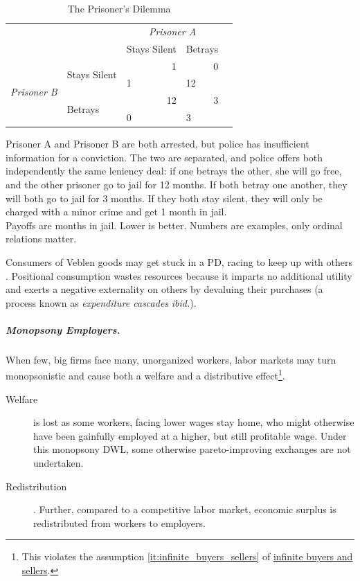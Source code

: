 \begin{table}
			\caption{The Prisoner's Dilemma}
			\label{tab:PD}
			\begin{center}
			\begin{tabular}{m{1cm}m{2,3cm}m{}m{}m{}}
				& & \multicolumn{2}{c}{\emph{Prisoner A}} \\
				& &Stays Silent & Betrays\\ 
				\cline{3-4}
				\multicolumn{1}{c}{\multirow{4}{*}{\emph{Prisoner B}}} & \multirow{2}{}{Stays Silent} & 		\multicolumn{1}{|r|}{1} & \multicolumn{1}{r|}{0}\\ 
				\multicolumn{1}{c}{} & \multicolumn{1}{c}{}& \multicolumn{1}{|l|}{1} & \multicolumn{1}{l|}{12}\\ 
				\cline{3-4}
				\multicolumn{1}{c}{} & \multirow{2}{2,3cm}{Betrays} & \multicolumn{1}{|r|}{12} & \multicolumn{1}{r|}{3}\\ 
				\multicolumn{1}{c}{} & \multicolumn{1}{c}{}& \multicolumn{1}{|l|}{0} & \multicolumn{1}{l|}{3}\\ 
				\cline{3-4}
			\end{tabular}
			\end{center}
			\scriptsize{Prisoner A and Prisoner B are both arrested, but police has insufficient information for a conviction. The two are separated, and police offers both independently the same leniency deal: if one betrays the other, she will go free, and the other prisoner go to jail for 12 months. If both betray one another, they will both go to jail for 3 months. If they both stay silent, they will only be charged with a minor crime and get 1 month in jail. \\
			Payoffs are months in jail. Lower is better. Numbers are examples, only ordinal relations matter.}
		\end{table}


Consumers of Veblen goods may get stuck in a \gls{PD}, racing to keep up with others \citep{Frank1987}. Positional consumption wastes resources because it imparts no additional utility and exerts a negative externality on others by devaluing their purchases (a process known as \emph{expenditure cascades} \emph{ibid.}). 

\subparagraph[Monopsony Employers]{Monopsony Employers.} \label{sec:monopsony_employers} When few, big firms face many, unorganized workers, labor markets may turn monopsonistic and cause both a welfare and a distributive effect\footnote{
	This violates the  assumption \ref{it:infinite_buyers_sellers} of \hyperref[it:infinite_buyers_sellers]{infinite buyers and sellers}.}.
\begin{description}
	\item[Welfare] is lost as some workers, facing lower wages stay home, who might otherwise have been gainfully employed at a higher, but still profitable wage. Under this monopsony \gls{DWL}, some otherwise pareto-improving exchanges are not undertaken. 
	\item[Redistribution]. Further, compared to a competitive labor market, economic surplus is redistributed from workers to employers. 
\end{description}

